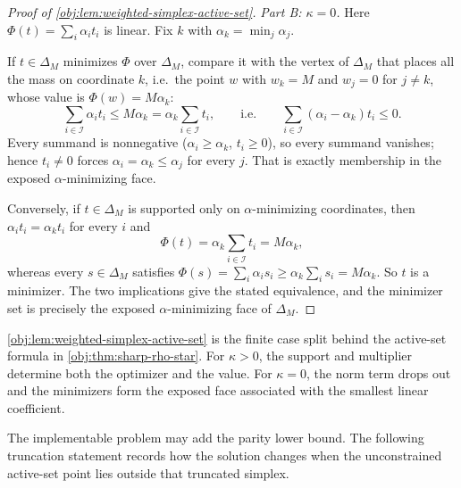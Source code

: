 \documentclass[11pt]{article}
\begin{document}
\begin{proof}[Proof of \cref{obj:lem:weighted-simplex-active-set}]
\emph{Part B: \(\kappa=0\).}  Here \(\Phi(t)=\sum_i\alpha_it_i\) is linear.  Fix \(k\) with \(\alpha_k=\min_j\alpha_j\).

If \(t\in\Delta_M\) minimizes \(\Phi\) over \(\Delta_M\), compare it with the vertex of \(\Delta_M\) that places all the mass on coordinate \(k\), i.e.\ the point \(w\) with \(w_k=M\) and \(w_j=0\) for \(j\ne k\), whose value is \(\Phi(w)=M\alpha_k\):
\[
\sum_{i\in\mathcal I}\alpha_it_i\le M\alpha_k=\alpha_k\sum_{i\in\mathcal I}t_i,
\qquad\text{i.e.}\qquad
\sum_{i\in\mathcal I}(\alpha_i-\alpha_k)t_i\le0 .
\]
Every summand is nonnegative (\(\alpha_i\ge\alpha_k\), \(t_i\ge0\)), so every summand vanishes; hence \(t_i\ne0\) forces \(\alpha_i=\alpha_k\le\alpha_j\) for every \(j\).  That is exactly membership in the exposed \(\alpha\)-minimizing face.

Conversely, if \(t\in\Delta_M\) is supported only on \(\alpha\)-minimizing coordinates, then \(\alpha_it_i=\alpha_kt_i\) for every \(i\) and
\[
\Phi(t)=\alpha_k\sum_{i\in\mathcal I}t_i=M\alpha_k ,
\]
whereas every \(s\in\Delta_M\) satisfies \(\Phi(s)=\sum_i\alpha_is_i\ge\alpha_k\sum_is_i=M\alpha_k\).  So \(t\) is a minimizer.  The two implications give the stated equivalence, and the minimizer set is precisely the exposed \(\alpha\)-minimizing face of \(\Delta_M\). %
\end{proof}

\cref{obj:lem:weighted-simplex-active-set} is the finite case split behind the active-set formula in \cref{obj:thm:sharp-rho-star}. For \(\kappa>0\), the support and multiplier determine both the optimizer and the value. For \(\kappa=0\), the norm term drops out and the minimizers form the exposed face associated with the smallest linear coefficient.

The implementable problem may add the parity lower bound. The following truncation statement records how the solution changes when the unconstrained active-set point lies outside that truncated simplex.
\end{document}
